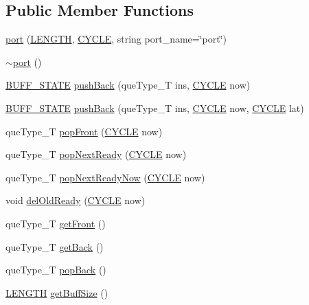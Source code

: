 \subsection*{Public Member Functions}
\begin{DoxyCompactItemize}
\item 
\hyperlink{classport_aa397f17dedc41b12c65d9cfce47d5f5c}{port} (\hyperlink{global_2global_8h_ad7ec63c69447a2b630929c8e0197860d}{LENGTH}, \hyperlink{global_2global_8h_a7e19a550ec11d1ed921deb20c22efb5b}{CYCLE}, string port\_\-name=\char`\"{}port\char`\"{})
\item 
\hyperlink{classport_a51a6e901a1eac3a1c3fd35a140fecbfb}{$\sim$port} ()
\item 
\hyperlink{global_2global_8h_a8bd4ea2582a6025c1cfe99bf9947489c}{BUFF\_\-STATE} \hyperlink{classport_a52ad1c5223f028930491b024f26467fa}{pushBack} (queType\_\-T ins, \hyperlink{global_2global_8h_a7e19a550ec11d1ed921deb20c22efb5b}{CYCLE} now)
\item 
\hyperlink{global_2global_8h_a8bd4ea2582a6025c1cfe99bf9947489c}{BUFF\_\-STATE} \hyperlink{classport_a7c709a92ed8525cf8a310b294e606267}{pushBack} (queType\_\-T ins, \hyperlink{global_2global_8h_a7e19a550ec11d1ed921deb20c22efb5b}{CYCLE} now, \hyperlink{global_2global_8h_a7e19a550ec11d1ed921deb20c22efb5b}{CYCLE} lat)
\item 
queType\_\-T \hyperlink{classport_a95bf81afb2a6c03ac2272b3708322b74}{popFront} (\hyperlink{global_2global_8h_a7e19a550ec11d1ed921deb20c22efb5b}{CYCLE} now)
\item 
queType\_\-T \hyperlink{classport_acf2f0e0dfd7a375c2c87780d4eaacc99}{popNextReady} (\hyperlink{global_2global_8h_a7e19a550ec11d1ed921deb20c22efb5b}{CYCLE} now)
\item 
queType\_\-T \hyperlink{classport_ac1c1b53525c4c69eba7c28e59275e45f}{popNextReadyNow} (\hyperlink{global_2global_8h_a7e19a550ec11d1ed921deb20c22efb5b}{CYCLE} now)
\item 
void \hyperlink{classport_aec1749eb1d434806670ba00b669bad78}{delOldReady} (\hyperlink{global_2global_8h_a7e19a550ec11d1ed921deb20c22efb5b}{CYCLE} now)
\item 
queType\_\-T \hyperlink{classport_afe64047b4e7df87d4a031097ea159852}{getFront} ()
\item 
queType\_\-T \hyperlink{classport_a53d30f96ac41c4f3a60174cd66b1656e}{getBack} ()
\item 
queType\_\-T \hyperlink{classport_aa102d5f7c3e925382f62a37d220888ff}{popBack} ()
\item 
\hyperlink{global_2global_8h_ad7ec63c69447a2b630929c8e0197860d}{LENGTH} \hyperlink{classport_a7276424a4d3b305c198159f2ed6b7dab}{getBuffSize} ()

\end{DoxyCompactItemize}
